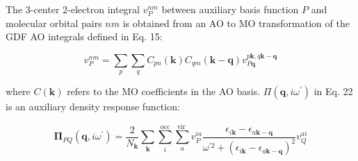The 3-center 2-electron integral $v_{P}^{n m}$ between auxiliary basis function $P$ and molecular orbital pairs $n m$ is obtained from an AO to MO transformation of the GDF AO integrals defined in Eq. 15:

\begin{equation*}
v_{P}^{n m}=\sum_{p} \sum_{q} C_{p n}(\mathbf{k}) C_{q m}(\mathbf{k}-\mathbf{q}) v_{P \mathbf{q}}^{p \mathbf{k}, q \mathbf{k}-\mathbf{q}} 
\end{equation*}

where $C(\mathbf{k})$ refers to the MO coefficients in the AO basis. $\Pi\left(\mathbf{q}, i \omega^{\prime}\right)$ in Eq. 22 is an auxiliary density response function:

\begin{equation*}
\boldsymbol{\Pi}_{P Q}\left(\mathbf{q}, i \omega^{\prime}\right)=\frac{2}{N_{\mathbf{k}}} \sum_{\mathbf{k}} \sum_{i}^{\mathrm{occ}} \sum_{a}^{\text {vir }} v_{P}^{i a} \frac{\epsilon_{i \mathbf{k}}-\epsilon_{a \mathbf{k}-\mathbf{q}}}{\omega^{\prime 2}+\left(\epsilon_{i \mathbf{k}}-\epsilon_{a \mathbf{k}-\mathbf{q}}\right)^{2}} v_{Q}^{a i} 
\end{equation*}
